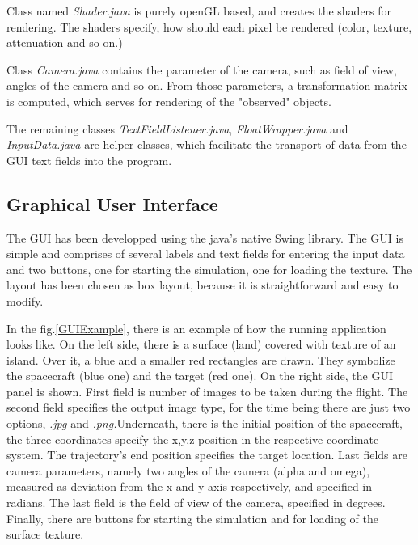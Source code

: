 \documentclass[english,12pt,a4paper,pdftex,elec,utf8]{aaltothesis}
\begin{document}
Class named \textit{Shader.java} is purely openGL based, and creates the shaders for rendering. The shaders specify, how should each pixel be rendered (color, texture, attenuation and so on.)

Class \textit{Camera.java} contains the parameter of the camera, such as field of view, angles of the camera and so on. From those parameters, a transformation matrix is computed, which serves for rendering of the "observed" objects.

The remaining classes \textit{TextFieldListener.java}, \textit{FloatWrapper.java} and \textit{InputData.java} are helper classes, which facilitate the transport of data from the GUI text fields into the program.

\subsection*{Graphical User Interface}

The GUI has been developped using the java's native Swing library. The GUI is simple and comprises of several labels and text fields for entering the input data and two buttons, one for starting the simulation, one for loading the texture. The layout has been chosen as box layout, because it is straightforward and easy to modify.

In the fig.\ref{GUIExample}, there is an example of how the running application looks like. On the left side, there is a surface (land) covered with texture of an island. Over it, a blue and a smaller red rectangles are drawn. They symbolize the spacecraft (blue one) and the target (red one). On the right side, the GUI panel is shown. First field is number of images to be taken during the flight. The second field specifies the output image type, for the time being there are just two options, \textit{.jpg} and \textit{.png.}Underneath, there is the initial position of the spacecraft, the three coordinates specify the x,y,z position in the respective coordinate system. The trajectory's end position specifies the target location. Last fields are camera parameters, namely two angles of the camera (alpha and omega), measured as deviation from the x and y axis respectively, and specified in radians. The last field is the field of view of the camera, specified in degrees. Finally, there are buttons for starting the simulation and for loading of the surface texture.
\end{document}
